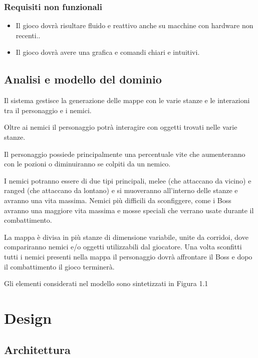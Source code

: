 \documentclass[a4paper,12pt]{report}
\begin{document}
    \subsection{Requisiti non funzionali}
    \begin{itemize}
        \item Il gioco dovrà risultare fluido e reattivo anche su macchine con hardware non recenti..
        \item Il gioco dovrà avere una grafica e comandi chiari e intuitivi.
    \end{itemize}
    \section{Analisi e modello del dominio}
    \par Il sistema gestisce la generazione delle mappe con le varie stanze e le interazioni tra il
    personaggio e i nemici.
    \par Oltre ai nemici il personaggio potrà interagire con oggetti trovati nelle varie stanze.
    \par Il personaggio possiede principalmente una percentuale vite che aumenteranno con le pozioni
    o diminuiranno se colpiti da un nemico.
    \par I nemici potranno essere di due tipi principali, melee (che attaccano da vicino) e ranged (che attaccano da lontano)
    e si muoveranno all'interno delle stanze e avranno una vita massima. Nemici più difficili da sconfiggere,
    come i Boss avranno una maggiore vita massima e mosse speciali che verrano usate durante il combattimento.
    \par La mappa è divisa in più stanze di dimensione variabile, unite da corridoi, dove compariranno nemici
    e/o oggetti utilizzabili dal giocatore.
    Una volta sconfitti tutti i nemici presenti nella mappa il personaggio dovrà affrontare il Boss e dopo il
    combattimento il gioco terminerà.
    \par \par Gli elementi considerati nel modello sono sintetizzati in Figura 1.1


    \chapter{Design}
    \section{Architettura}
\end{document}
